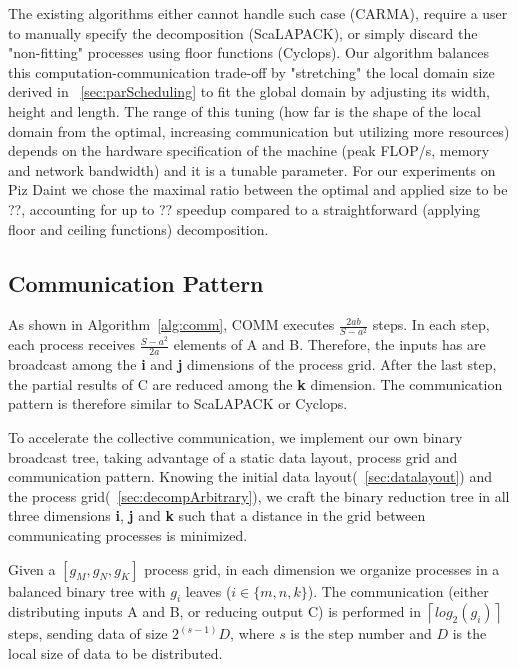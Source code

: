 \documentclass[sigplan,review,anonymous]{acmart}\settopmatter{printfolios=true,printccs=false,printacmref=false}
\begin{document}
The existing algorithms either cannot handle such case (CARMA), 
require a user to manually specify the decomposition (ScaLAPACK), or 
simply discard the "non-fitting" processes using floor functions 
(Cyclops). Our algorithm balances this computation-communication 
trade-off by "stretching" the local domain size 
derived in ~\cref{sec:parScheduling} to fit the global 
domain by adjusting its width, height and length. The range of this 
tuning (how far is the shape of the local domain from the optimal, 
increasing communication but utilizing more resources) 
depends on the hardware specification of the 
machine (peak FLOP/s, memory and network bandwidth) and it is a
tunable parameter. For our 
experiments on Piz Daint we chose the maximal ratio between the 
optimal and applied size to be ??, accounting for up to ?? speedup 
compared to a straightforward (applying floor and ceiling functions) 
decomposition.

\subsection{Communication Pattern}
\label{sec:commPattern}
As shown in Algorithm~\ref{alg:comm}, COMM executes $\frac{2ab}{S - a^2}$ 
steps. In each step, each process receives $\frac{S - a^2}{2a}$ elements of A 
and 
B. Therefore, the inputs has are broadcast among the \textbf{i} and \textbf{j} 
dimensions of the process grid. After the last step, the partial results of C 
are reduced among the \textbf{k} dimension. The communication pattern is 
therefore similar to ScaLAPACK or Cyclops.

To accelerate the collective communication, we implement our own binary 
broadcast 
tree, taking advantage of a static data layout, process grid and communication 
pattern.
 Knowing the initial data 
layout(~\cref{sec:datalayout}) and the process 
grid(~\cref{sec:decompArbitrary}), we craft the binary reduction tree 
in all three dimensions \textbf{i}, \textbf{j} and \textbf{k} such that a 
distance in the grid between communicating processes is minimized. 

Given a $[g_M, g_N, g_K]$ process grid, in each dimension we organize processes 
in a balanced binary tree with $g_i$ leaves ($i \in \{m,n,k\}$). The 
communication 
(either distributing inputs A and B, or reducing output C) is performed in 
$\left \lceil{log_2(g_i)} \right \rceil$ steps, sending data of size $2^(s-1) 
D$, where $s$ is the step 
number and $D$ is the local size of data to be distributed.
\end{document}
